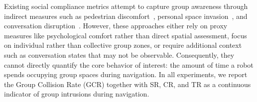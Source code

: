 
Existing social compliance metrics attempt to capture group awareness through indirect measures such as pedestrian discomfort~\cite{trautman2015robot}, personal space invasion~\cite{kirby2009companion}, and conversation disruption~\cite{truong2017toward}. However, these approaches either rely on proxy measures like psychological comfort rather than direct spatial assessment, focus on individual rather than collective group zones, or require additional context such as conversation states that may not be observable. Consequently, they cannot directly quantify the core behavior of interest: the amount of time a robot spends occupying group spaces during navigation.
In all experiments, we report the Group Collision Rate (GCR) together with SR, CR, and TR as a continuous indicator of group intrusions during navigation.










